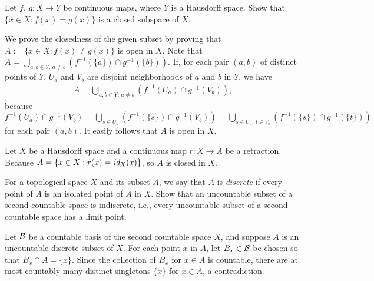 \begin{prob}
    Let $f,\,g: X\rightarrow Y$ be continuous maps, where $Y$ is a Hausdorff space.
    Show that $\{x\in X: f(x)=g(x)\}$ is a closed subspace of $X$.
\end{prob}
\begin{sol}
    We prove the closedness of the given subset by proving that $A:=\{x\in X: f(x)\neq g(x)\}$ is open in $X$.
    Note that $A=\bigcup_{a, b\in Y,\, a\neq b}(f^{-1}(\{a\})\cap g^{-1}(\{b\}))$.
    If, for each pair $(a, b)$ of distinct points of $Y$, $U_a$ and $V_b$ are disjoint neighborhoods of $a$ and $b$ in $Y$, we have
    \begin{align*}
        A=\bigcup_{a, b\in Y,\, a\neq b} (f^{-1}(U_a)\cap g^{-1}(V_b)),
    \end{align*}
    because $f^{-1}(U_a)\cap g^{-1}(V_b)=\bigcup_{s\in U_a}\left(f^{-1}(\{s\})\cap g^{-1}(V_b)\right)=\bigcup_{s\in U_a,\, t\in V_b}(f^{-1}(\{s\})\cap g^{-1}(\{t\}))$ for each pair $(a, b)$.
    It easily follows that $A$ is open in $X$.
\end{sol}
\begin{rmk}
    Let $X$ be a Hausdorff space and a continuous map $r: X\rightarrow A$ be a retraction.
    Because $A=\{x\in X: r(x)=\textit{id}_{X}(x)\}$, so $A$ is closed in $X$.
\end{rmk}

\begin{prob}
    For a topological space $X$ and its subset $A$, we say that $A$ is \textit{discrete} if every point of $A$ is an isolated point of $A$ in $X$.
    Show that an uncountable subset of a second countable space is indiscrete, i.e., every uncountable subset of a second countable space has a limit point.
\end{prob}
\begin{sol}
    Let ${\mathcal{B}}$ be a countable basis of the second countable space $X$, and suppose $A$ is an uncountable discrete subset of $X$.
    For each point $x$ in $A$, let $B_x\in{\mathcal{B}}$ be chosen so that $B_x\cap A=\{x\}$.
    Since the collection of $B_x$ for $x\in A$ is countable, there are at most countably many distinct singletons $\{x\}$ for $x\in A$, a contradiction.
\end{sol}